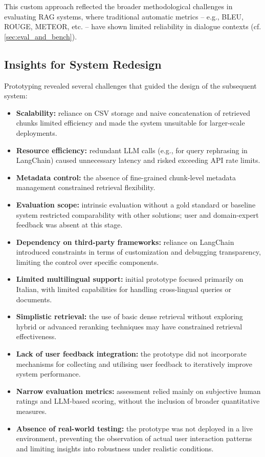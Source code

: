 \begin{spacing}{1.5}
This custom approach reflected the broader methodological challenges in evaluating RAG systems, where traditional automatic metrics -- e.g., BLEU, ROUGE, METEOR, etc. -- have shown limited reliability in dialogue contexts (cf. \autoref{sec:eval_and_bench}).

\subsection{Insights for System Redesign}
Prototyping revealed several challenges that guided the design of the subsequent system:
\begin{itemize}
      \item \textbf{Scalability:} reliance on CSV storage and naive concatenation of retrieved chunks limited efficiency and made the system unsuitable for larger-scale deployments.
      \item \textbf{Resource efficiency:} redundant LLM calls (e.g., for query rephrasing in LangChain) caused unnecessary latency and risked exceeding API rate limits.
      \item \textbf{Metadata control:} the absence of fine-grained chunk-level metadata management constrained retrieval flexibility.
      \item \textbf{Evaluation scope:} intrinsic evaluation without a gold standard or baseline system restricted comparability with other solutions; user and domain-expert feedback was absent at this stage.
      \item \textbf{Dependency on third-party frameworks:} reliance on LangChain introduced constraints in terms of customization and debugging transparency, limiting the control over specific components.
      \item \textbf{Limited multilingual support:} initial prototype focused primarily on Italian, with limited capabilities for handling cross-lingual queries or documents.
      \item \textbf{Simplistic retrieval:} the use of basic dense retrieval without exploring hybrid or advanced reranking techniques may have constrained retrieval effectiveness.
      \item \textbf{Lack of user feedback integration:} the prototype did not incorporate mechanisms for collecting and utilising user feedback to iteratively improve system performance.
      \item \textbf{Narrow evaluation metrics:} assessment relied mainly on subjective human ratings and LLM-based scoring, without the inclusion of broader quantitative measures.
      \item \textbf{Absence of real-world testing:} the prototype was not deployed in a live environment, preventing the observation of actual user interaction patterns and limiting insights into robustness under realistic conditions.
\end{itemize}


\end{spacing}
